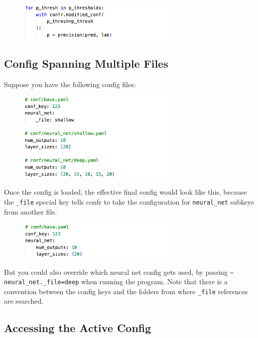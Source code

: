 \documentclass{itatnew}
\begin{document}
\begin{figure}[H]
    \centering
    \includegraphics[width=8cm]{c11.png}
\end{figure}

\subsection{Config Spanning Multiple Files}

Suppose you have the following config files:

\begin{figure}[H]
    \centering
    \includegraphics[width=8cm]{c12.png}
\end{figure}

Once the config is loaded, the effective final config would look like  this, because the \texttt{_file} special key tells confr to take the configuration for \texttt{neural_net} subkeys from another file.

\begin{figure}[H]
    \centering
    \includegraphics[width=8cm]{c13.png}
\end{figure}

But you could also override which neural net config gets used, by passing \texttt{--neural_net._file=deep} when running the program. Note that there is a convention between the config keys and the folders from where \texttt{_file} references are searched.

\subsection{Accessing the Active Config}
\end{document}
